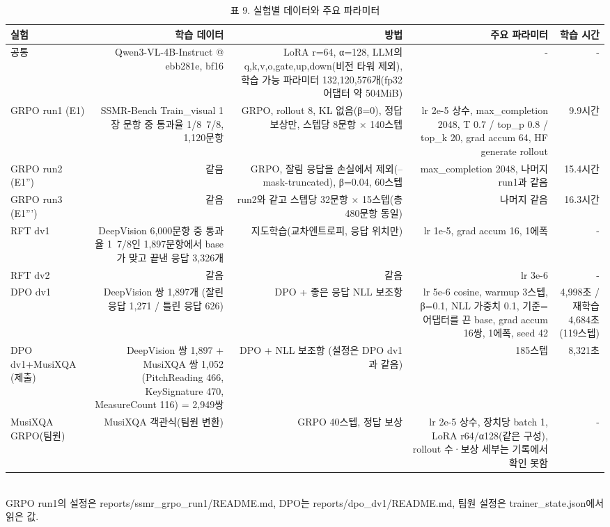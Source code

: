 \begin{table}[t]
\centering
\small
\caption{표 9. 실험별 데이터와 주요 파라미터}
\label{tab:table9_hyperparameters}
\begin{tabular}{lrrrr}
\toprule
실험 & 학습 데이터 & 방법 & 주요 파라미터 & 학습 시간 \\
\midrule
공통 & Qwen3-VL-4B-Instruct @ ebb281e, bf16 & LoRA r=64, α=128, LLM의 q,k,v,o,gate,up,down(비전 타워 제외), 학습 가능 파라미터 132,120,576개(fp32 어댑터 약 504MiB) & - & - \\
GRPO run1 (E1) & SSMR-Bench Train\_visual 1장 문항 중 통과율 1/8~7/8, 1,120문항 & GRPO, rollout 8, KL 없음(β=0), 정답 보상만, 스텝당 8문항 × 140스텝 & lr 2e-5 상수, max\_completion 2048, T 0.7 / top\_p 0.8 / top\_k 20, grad accum 64, HF generate rollout & 9.9시간 \\
GRPO run2 (E1'') & 같음 & GRPO, 잘림 응답을 손실에서 제외(--mask-truncated), β=0.04, 60스텝 & max\_completion 2048, 나머지 run1과 같음 & 15.4시간 \\
GRPO run3 (E1''') & 같음 & run2와 같고 스텝당 32문항 × 15스텝(총 480문항 동일) & 나머지 같음 & 16.3시간 \\
RFT dv1 & DeepVision 6,000문항 중 통과율 1~7/8인 1,897문항에서 base가 맞고 끝낸 응답 3,326개 & 지도학습(교차엔트로피, 응답 위치만) & lr 1e-5, grad accum 16, 1에폭 & - \\
RFT dv2 & 같음 & 같음 & lr 3e-6 & - \\
DPO dv1 & DeepVision 쌍 1,897개 (잘린 응답 1,271 / 틀린 응답 626) & DPO + 좋은 응답 NLL 보조항 & lr 5e-6 cosine, warmup 3스텝, β=0.1, NLL 가중치 0.1, 기준=어댑터를 끈 base, grad accum 16쌍, 1에폭, seed 42 & 4,998초 / 재학습 4,684초(119스텝) \\
DPO dv1+MusiXQA (제출) & DeepVision 쌍 1,897 + MusiXQA 쌍 1,052 (PitchReading 466, KeySignature 470, MeasureCount 116) = 2,949쌍 & DPO + NLL 보조항 (설정은 DPO dv1과 같음) & 185스텝 & 8,321초 \\
MusiXQA GRPO(팀원) & MusiXQA 객관식(팀원 변환) & GRPO 40스텝, 정답 보상 & lr 2e-5 상수, 장치당 batch 1, LoRA r64/α128(같은 구성), rollout 수·보상 세부는 기록에서 확인 못함 & - \\
\bottomrule
\end{tabular}
\\[2pt]{\footnotesize GRPO run1의 설정은 reports/ssmr\_grpo\_run1/README.md, DPO는 reports/dpo\_dv1/README.md, 팀원 설정은 trainer\_state.json에서 읽은 값.}
\end{table}
